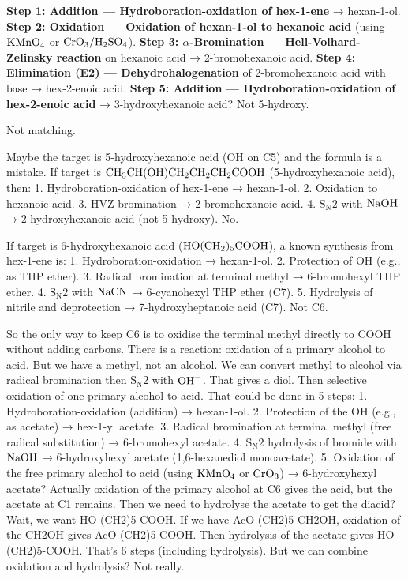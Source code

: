\documentclass[11pt]{article}
\begin{document}
\begin{corrige}
\begin{enumerate}
\textbf{Step 1: Addition — Hydroboration-oxidation of hex-1-ene} → hexan-1-ol.
\textbf{Step 2: Oxidation — Oxidation of hexan-1-ol to hexanoic acid} (using \(\ce{KMnO4}\) or \(\ce{CrO3}/\ce{H2SO4}\)).
\textbf{Step 3: \(\alpha\)-Bromination — Hell-Volhard-Zelinsky reaction} on hexanoic acid → 2-bromohexanoic acid.
\textbf{Step 4: Elimination (E2) — Dehydrohalogenation} of 2-bromohexanoic acid with base → hex-2-enoic acid.
\textbf{Step 5: Addition — Hydroboration-oxidation of hex-2-enoic acid} → 3-hydroxyhexanoic acid? Not 5-hydroxy.

Not matching.

Maybe the target is 5-hydroxyhexanoic acid (OH on C5) and the formula is a mistake. If target is \(\ce{CH3CH(OH)CH2CH2CH2COOH}\) (5-hydroxyhexanoic acid), then:
1. Hydroboration-oxidation of hex-1-ene → hexan-1-ol.
2. Oxidation to hexanoic acid.
3. HVZ bromination → 2-bromohexanoic acid.
4. \(\mathrm{S_N2}\) with \(\ce{NaOH}\) → 2-hydroxyhexanoic acid (not 5-hydroxy).
No.

If target is 6-hydroxyhexanoic acid (\(\ce{HO(CH2)5COOH}\)), a known synthesis from hex-1-ene is:
1. Hydroboration-oxidation → hexan-1-ol.
2. Protection of OH (e.g., as THP ether).
3. Radical bromination at terminal methyl → 6-bromohexyl THP ether.
4. \(\mathrm{S_N2}\) with \(\ce{NaCN}\) → 6-cyanohexyl THP ether (C7).
5. Hydrolysis of nitrile and deprotection → 7-hydroxyheptanoic acid (C7). Not C6.

So the only way to keep C6 is to oxidise the terminal methyl directly to COOH without adding carbons. There is a reaction: oxidation of a primary alcohol to acid. But we have a methyl, not an alcohol. We can convert methyl to alcohol via radical bromination then \(\mathrm{S_N2}\) with \(\ce{OH-}\). That gives a diol. Then selective oxidation of one primary alcohol to acid. That could be done in 5 steps:
1. Hydroboration-oxidation (addition) → hexan-1-ol.
2. Protection of the OH (e.g., as acetate) → hex-1-yl acetate.
3. Radical bromination at terminal methyl (free radical substitution) → 6-bromohexyl acetate.
4. \(\mathrm{S_N2}\) hydrolysis of bromide with \(\ce{NaOH}\) → 6-hydroxyhexyl acetate (1,6-hexanediol monoacetate).
5. Oxidation of the free primary alcohol to acid (using \(\ce{KMnO4}\) or \(\ce{CrO3}\)) → 6-hydroxyhexyl acetate? Actually oxidation of the primary alcohol at C6 gives the acid, but the acetate at C1 remains. Then we need to hydrolyse the acetate to get the diacid? Wait, we want HO-(CH2)5-COOH. If we have AcO-(CH2)5-CH2OH, oxidation of the CH2OH gives AcO-(CH2)5-COOH. Then hydrolysis of the acetate gives HO-(CH2)5-COOH. That's 6 steps (including hydrolysis). But we can combine oxidation and hydrolysis? Not really.


\end{enumerate}
\end{corrige}
\end{document}
